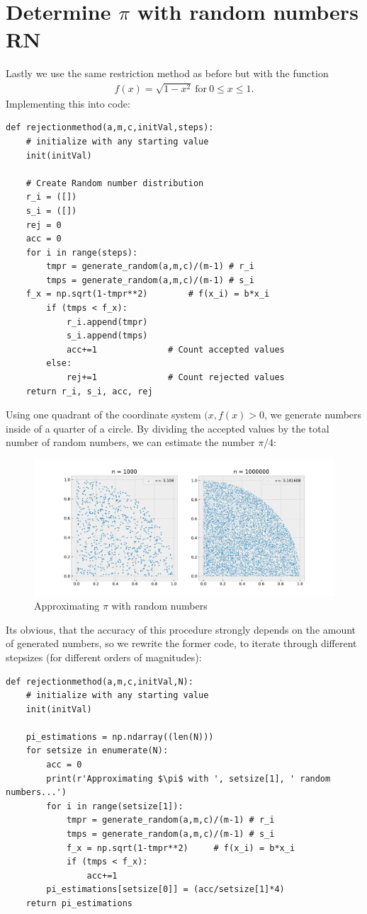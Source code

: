 \documentclass{article}
\begin{document}
\section{Determine \( \pi \) with random numbers RN}
Lastly we use the same restriction method as before but with the function
\begin{align}
    f(x) = \sqrt{1-x^2} \ \text{for} \ 0 \leq x \leq 1.
\end{align}
Implementing this into code:
\begin{lstlisting}
def rejectionmethod(a,m,c,initVal,steps):
    # initialize with any starting value
    init(initVal)

    # Create Random number distribution
    r_i = ([])
    s_i = ([])
    rej = 0
    acc = 0
    for i in range(steps):
        tmpr = generate_random(a,m,c)/(m-1) # r_i
        tmps = generate_random(a,m,c)/(m-1) # s_i
	f_x = np.sqrt(1-tmpr**2)	    # f(x_i) = b*x_i
        if (tmps < f_x): 
            r_i.append(tmpr)
            s_i.append(tmps)
            acc+=1			    # Count accepted values
        else: 
            rej+=1			    # Count rejected values
    return r_i, s_i, acc, rej
\end{lstlisting}
Using one quadrant of the coordinate system \( (x, f(x) > 0 \), we generate
numbers inside of a quarter of a circle. By dividing the accepted values by
the total number of random numbers, we can estimate the number \( \pi/4 \):
\begin{figure}[H]
    \centering
    \includegraphics[width=12cm]{Fig3-1.pdf}
    \caption{Approximating \( \pi \) with random numbers}
\end{figure}
Its obvious, that the accuracy of this procedure strongly depends on the amount
of generated numbers, so we rewrite the former code, to iterate through
different stepsizes (for different orders of magnitudes):
\begin{lstlisting}
def rejectionmethod(a,m,c,initVal,N):
    # initialize with any starting value
    init(initVal)

    pi_estimations = np.ndarray((len(N)))
    for setsize in enumerate(N):
        acc = 0
        print(r'Approximating $\pi$ with ', setsize[1], ' random numbers...')
        for i in range(setsize[1]):
            tmpr = generate_random(a,m,c)/(m-1) # r_i
            tmps = generate_random(a,m,c)/(m-1) # s_i
            f_x = np.sqrt(1-tmpr**2)     # f(x_i) = b*x_i
            if (tmps < f_x): 
                acc+=1
        pi_estimations[setsize[0]] = (acc/setsize[1]*4)
    return pi_estimations
\end{lstlisting}
\end{document}
